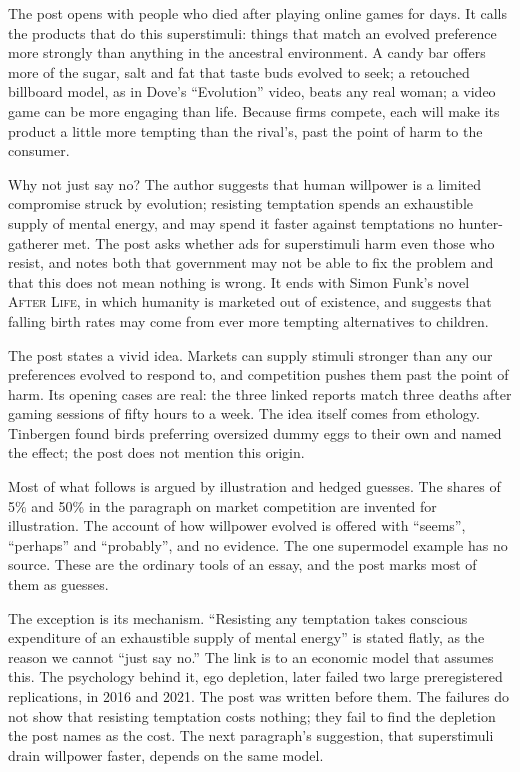 \begin{afterword}
\summaryhead

The post opens with people who died after playing online games for days. It calls the products that do this superstimuli: things that match an evolved preference more strongly than anything in the ancestral environment. A candy bar offers more of the sugar, salt and fat that taste buds evolved to seek; a retouched billboard model, as in Dove's ``Evolution'' video, beats any real woman; a video game can be more engaging than life. Because firms compete, each will make its product a little more tempting than the rival's, past the point of harm to the consumer.

Why not just say no? The author suggests that human willpower is a limited compromise struck by evolution; resisting temptation spends an exhaustible supply of mental energy, and may spend it faster against temptations no hunter-gatherer met. The post asks whether ads for superstimuli harm even those who resist, and notes both that government may not be able to fix the problem and that this does not mean nothing is wrong. It ends with Simon Funk's novel \textsc{After Life}, in which humanity is marketed out of existence, and suggests that falling birth rates may come from ever more tempting alternatives to children.

\responsehead

The post states a vivid idea. Markets can supply stimuli stronger than any our preferences evolved to respond to, and competition pushes them past the point of harm. Its opening cases are real: the three linked reports match three deaths after gaming sessions of fifty hours to a week. The idea itself comes from ethology. Tinbergen found birds preferring oversized dummy eggs to their own and named the effect; the post does not mention this origin.

Most of what follows is argued by illustration and hedged guesses. The shares of 5\% and 50\% in the paragraph on market competition are invented for illustration. The account of how willpower evolved is offered with ``seems'', ``perhaps'' and ``probably'', and no evidence. The one supermodel example has no source. These are the ordinary tools of an essay, and the post marks most of them as guesses.

The exception is its mechanism. ``Resisting any temptation takes conscious expenditure of an exhaustible supply of mental energy'' is stated flatly, as the reason we cannot ``just say no.'' The link is to an economic model that assumes this. The psychology behind it, ego depletion, later failed two large preregistered replications, in 2016 and 2021. The post was written before them. The failures do not show that resisting temptation costs nothing; they fail to find the depletion the post names as the cost. The next paragraph's suggestion, that superstimuli drain willpower faster, depends on the same model.


\end{afterword}

